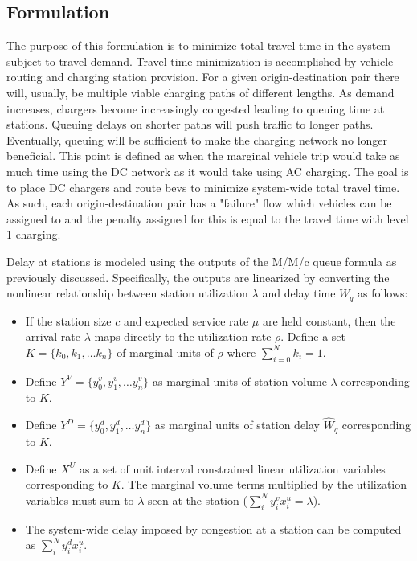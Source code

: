 \subsection{Formulation}

The purpose of this formulation is to minimize total travel time in the system subject to travel demand. Travel time minimization is accomplished by vehicle routing and charging station provision. For a given origin-destination pair there will, usually, be multiple viable charging paths of different lengths. As demand increases, chargers become increasingly congested leading to queuing time at stations. Queuing delays on shorter paths will push traffic to longer paths. Eventually, queuing will be sufficient to make the charging network no longer beneficial. This point is defined as when the marginal vehicle trip would take as much time using the DC network as it would take using AC charging. The goal is to place DC chargers and route \glspl{bev} to minimize system-wide total travel time. As such, each origin-destination pair has a "failure" flow which vehicles can be assigned to and the penalty assigned for this is equal to the travel time with level 1 charging.

Delay at stations is modeled using the outputs of the M/M/c queue formula as previously discussed. Specifically, the outputs are linearized by converting the nonlinear relationship between station utilization $\lambda$ and delay time $W_q$ as follows:

\begin{itemize}
	\item If the station size $c$ and expected service rate $\mu$ are held constant, then the arrival rate $\lambda$ maps directly to the utilization rate $\rho$. Define a set $K = \{k_0, k_1, \dots k_n\}$ of marginal units of $\rho$ where $\sum_{i = 0}^{N} k_i = 1$.
	\item Define $Y^V = \{y^v_0, y^v_1, \dots y^v_n\}$ as marginal units of station volume $\lambda$ corresponding to $K$.
	\item Define $Y^D = \{y^d_0, y^d_1, \dots y^d_n\}$ as marginal units of station delay $\hat{W}_q$ corresponding to $K$.
	\item Define $X^U$ as a set of unit interval constrained linear utilization variables corresponding to $K$. The marginal volume terms multiplied by the utilization variables must sum to $\lambda$ seen at the station ($\sum_{i}^{N} y^v_i x^u_i = \lambda$).
	\item The system-wide delay imposed by congestion at a station can be computed as $\sum_{i}^{N} y^d_i x^u_i$.
\end{itemize}

